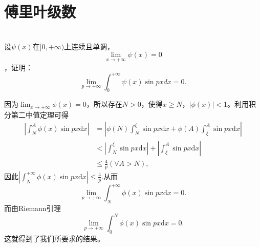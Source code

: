   \section{傅里叶级数}
  \begin{exercise}
  \hfill\\
  设$\psi(x)$在$[0,+\infty)$上连续且单调，$$\displaystyle\lim_{x\rightarrow+\infty}\psi(x)=0$$，证明：$$\displaystyle\lim_{p\rightarrow+\infty}\int_0^{+\infty}\psi(x)\sin pxdx=0.$$  
  
 因为$\lim_{x\rightarrow+\infty}\phi(x)=0$，所以存在$N>0$，使得$x\geq N$，$|\phi(x)|<1$。利用积分第二中值定理可得
\begin{align*}
|\int_N^A\phi(x)\sin px\mathrm{d}x|&=|\phi(N)\int_N^{\xi}\sin px\mathrm{d}x+\phi(A)\int_{\xi}^A\sin px\mathrm{d}x|\\
&<|\int_N^{\xi}\sin px\mathrm{d}x|+|\int_{\xi}^A\sin px\mathrm{d}x|\\
&\leq\frac{4}{p}(\forall A>N),
\end{align*}
因此$|\int_N^{+\infty}\phi(x)\sin px\mathrm{d}x|\leq\frac{4}{p}.$从而
$$\lim_{p\rightarrow+\infty}\int_N^{+\infty}\phi(x)\sin px\mathrm{d}x=0.$$
而由Riemann引理
$$\lim_{p\rightarrow+\infty}\int_0^N\phi(x)\sin px\mathrm{d}x=0.$$
这就得到了我们所要求的结果。 
  \end{exercise}

